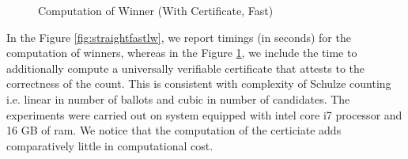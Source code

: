    
 \begin{figure}[!htb]
        \caption{\label{fig:straightfastlv} Computation of Winner (With Certificate, Fast)}
\end{figure}   




\noindent
In the Figure \ref{fig:straightfastlw}, we report timings (in seconds) for the computation of
winners, whereas in the Figure \ref{fig:straightfastlv}, we include the time to additionally
compute a universally verifiable certificate that attests  to the
correctness of the count. This is consistent with complexity of Schulze 
counting i.e. linear in number of ballots and cubic in number of candidates. 
The experiments were carried out on system 
equipped with intel core i7 processor and 16 GB of ram. We notice that the
computation of the certiciate adds comparatively little in
computational cost. 

